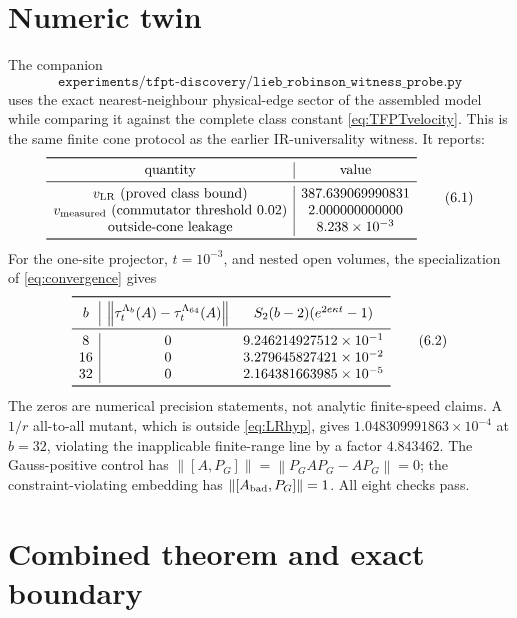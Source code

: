 \documentclass[11pt]{article}
\theoremstyle{remark}
\newcommand{\norm}[1]{\left\lVert#1\right\rVert}
\begin{document}
\section{Numeric twin}

The companion
\[
 \texttt{experiments/tfpt-discovery/lieb\_robinson\_witness\_probe.py}
\]
uses the exact nearest-neighbour physical-edge sector of the assembled
model while comparing it against the complete class constant
\eqref{eq:TFPTvelocity}.  This is the same finite cone protocol as the
earlier IR-universality witness.  It reports:
\[
\begin{array}{c|c}
\toprule
\text{quantity}&\text{value}\\
\midrule
v_{\rm LR}\text{ (proved class bound)}&387.639069990831\\
v_{\rm measured}\text{ (commutator threshold }0.02)&2.000000000000\\
\text{outside-cone leakage}&8.238\times10^{-3}\\
\bottomrule
\end{array}
\tag{6.1}\label{eq:numericvelocity}
\]
For the one-site projector, \(t=10^{-3}\), and nested open volumes, the
specialization of \eqref{eq:convergence} gives
\[
\begin{array}{c|cc}
\toprule
b&\norm{\tau_t^{\Lambda_b}(A)-\tau_t^{\Lambda_{64}}(A)}
&S_2(b-2)(e^{2e\kappa t}-1)\\
\midrule
8&0&9.246214927512\times10^{-1}\\
16&0&3.279645827421\times10^{-2}\\
32&0&2.164381663985\times10^{-5}\\
\bottomrule
\end{array}
\tag{6.2}\label{eq:numericconvergence}
\]
The zeros are numerical precision statements, not analytic finite-speed
claims.  A \(1/r\) all-to-all mutant, which is outside
\eqref{eq:LRhyp}, gives \(1.048309991863\times10^{-4}\) at \(b=32\),
violating the inapplicable finite-range line by a factor \(4.843462\).
The Gauss-positive control has
\(\norm{[A,P_G]}=\norm{P_GAP_G-AP_G}=0\); the constraint-violating
embedding has \(\norm{[A_{\rm bad},P_G]}=1\).  All eight checks pass.

\section{Combined theorem and exact boundary}
\end{document}
